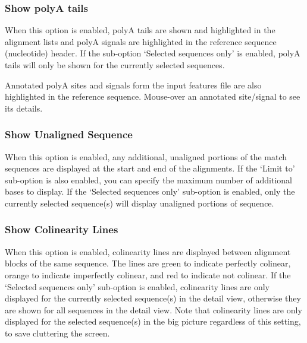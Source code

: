 \documentclass[letterpaper]{article}
\begin{document}
\bigskip

{\color[rgb]{0.30980393,0.5058824,0.7411765}\subsubsection[Show polyA tails]{Show polyA tails}}
\hypertarget{RefHeading2281056909880}{}
When this option is enabled, polyA tails are shown and highlighted in the alignment lists and polyA signals are highlighted in the reference sequence (nucleotide) header. If the sub-option {\textquoteleft}Selected sequences only{\textquoteright} is enabled, polyA tails will only be shown for the currently selected sequences.

\bigskip

Annotated polyA sites and signals form the input features file are also highlighted in the reference sequence. Mouse-over an annotated site/signal to see its details.

\bigskip

{\color[rgb]{0.30980393,0.5058824,0.7411765}\subsubsection[Show Unaligned Sequence ]{Show Unaligned Sequence }}
\hypertarget{RefHeading2321056909880}{}
When this option is enabled, any additional, unaligned portions of the match sequences are displayed at the start and end of the alignments. If the {\textquoteleft}Limit to{\textquoteright} sub-option is also enabled, you can specify the maximum number of additional bases to display. If the {\textquoteleft}Selected sequences only{\textquoteright} sub-option is enabled, only the currently selected sequence(s) will display unaligned portions of sequence.

\bigskip

{\color[rgb]{0.30980393,0.5058824,0.7411765}\subsubsection[Show Colinearity Lines ]{Show Colinearity Lines }}
\hypertarget{RefHeading2321056909880}{}
When this option is enabled, colinearity lines are displayed between alignment blocks of the same sequence. The lines are green to indicate perfectly colinear, orange to indicate imperfectly colinear, and red to indicate not colinear. If the {\textquoteleft}Selected sequences only{\textquoteright} sub-option is enabled, colinearity lines are only displayed for the currently selected sequence(s) in the detail view, otherwise they are shown for all sequences in the detail view. Note that colinearity lines are only displayed for the selected sequence(s) in the big picture regardless of this setting, to save cluttering the screen.
\bigskip
\end{document}
